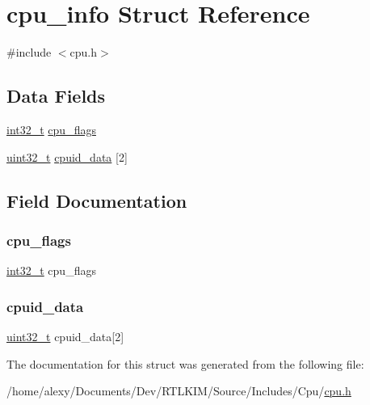 \hypertarget{structcpu__info}{}\section{cpu\+\_\+info Struct Reference}
\label{structcpu__info}


{\ttfamily \#include $<$cpu.\+h$>$}

\subsection*{Data Fields}
\begin{DoxyCompactItemize}
\item 
\hyperlink{stdint_8h_a32f2e37ee053cf2ce8ca28d1f74630e5}{int32\+\_\+t} \hyperlink{structcpu__info_a953b500793d2812165425fdaf4bb227b}{cpu\+\_\+flags}
\item 
\hyperlink{stdint_8h_a324c5d28c0d82f502a234ab99efac87a}{uint32\+\_\+t} \hyperlink{structcpu__info_a5c4f40e3d9e73b8ef63af33f33c3ed54}{cpuid\+\_\+data} \mbox{[}2\mbox{]}
\end{DoxyCompactItemize}


\subsection{Field Documentation}
\mbox{\label{structcpu__info_a953b500793d2812165425fdaf4bb227b}} 
\subsubsection{\texorpdfstring{cpu\+\_\+flags}{cpu\_flags}}
{\footnotesize\ttfamily \hyperlink{stdint_8h_a32f2e37ee053cf2ce8ca28d1f74630e5}{int32\+\_\+t} cpu\+\_\+flags}

\mbox{\label{structcpu__info_a5c4f40e3d9e73b8ef63af33f33c3ed54}} 
\subsubsection{\texorpdfstring{cpuid\+\_\+data}{cpuid\_data}}
{\footnotesize\ttfamily \hyperlink{stdint_8h_a324c5d28c0d82f502a234ab99efac87a}{uint32\+\_\+t} cpuid\+\_\+data\mbox{[}2\mbox{]}}



The documentation for this struct was generated from the following file\+:\begin{DoxyCompactItemize}
\item 
/home/alexy/\+Documents/\+Dev/\+R\+T\+L\+K\+I\+M/\+Source/\+Includes/\+Cpu/\hyperlink{cpu_8h}{cpu.\+h}\end{DoxyCompactItemize}
